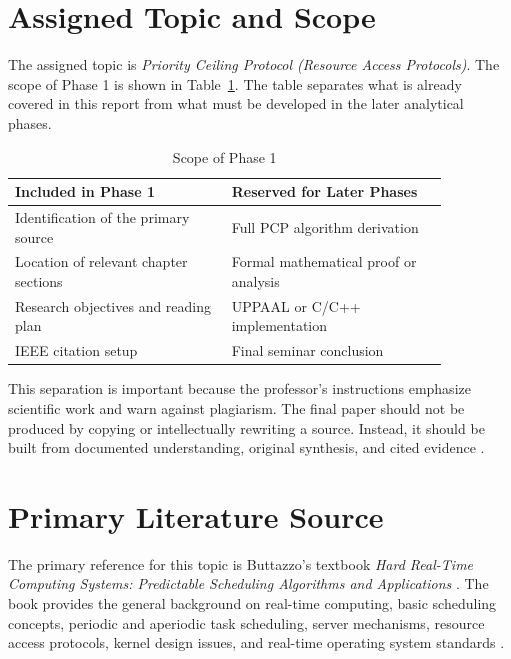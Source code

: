 \documentclass[conference]{IEEEtran}
\begin{document}
\section{Assigned Topic and Scope}
The assigned topic is \emph{Priority Ceiling Protocol (Resource Access Protocols)}. The scope of Phase 1 is shown in Table~\ref{tab:scope}. The table separates what is already covered in this report from what must be developed in the later analytical phases.

\begin{table}[htbp]
\caption{Scope of Phase 1}
\label{tab:scope}
\centering
\begin{tabular}{p{0.43\linewidth}p{0.43\linewidth}}
\toprule
\textbf{Included in Phase 1} & \textbf{Reserved for Later Phases} \\
\midrule
Identification of the primary source & Full PCP algorithm derivation \\
Location of relevant chapter sections & Formal mathematical proof or analysis \\
Research objectives and reading plan & UPPAAL or C/C++ implementation \\
IEEE citation setup & Final seminar conclusion \\
\bottomrule
\end{tabular}
\end{table}

This separation is important because the professor's instructions emphasize scientific work and warn against plagiarism. The final paper should not be produced by copying or intellectually rewriting a source. Instead, it should be built from documented understanding, original synthesis, and cited evidence \cite{HenklerSeminar2026}.

\section{Primary Literature Source}
The primary reference for this topic is Buttazzo's textbook \emph{Hard Real-Time Computing Systems: Predictable Scheduling Algorithms and Applications} \cite{Buttazzo2011}. The book provides the general background on real-time computing, basic scheduling concepts, periodic and aperiodic task scheduling, server mechanisms, resource access protocols, kernel design issues, and real-time operating system standards \cite{Buttazzo2011}.
\end{document}

